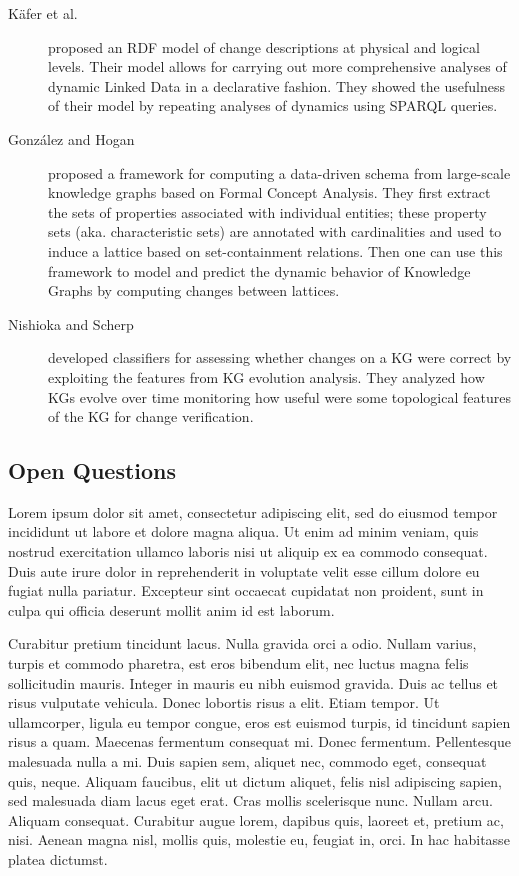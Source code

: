 \documentclass[sw]{iosart2x}
\begin{document}
\begin{description}
	\item[K{\"{a}}fer et al. \cite{KaferWA17}] proposed an RDF model of change descriptions at physical and logical levels. Their model allows for carrying out more comprehensive analyses of dynamic Linked Data in a declarative fashion. They showed the usefulness of their model by repeating analyses of dynamics using SPARQL queries.
	
	
	\item[Gonz\'{a}lez and Hogan \cite{GonzalezH18}]proposed a framework for computing a data-driven schema from large-scale knowledge graphs based on Formal Concept Analysis. They first extract the sets of properties associated with individual entities; these property sets (aka. characteristic sets) are annotated with cardinalities and used to induce a lattice based on set-containment relations. Then one can use this framework to model and predict the dynamic behavior of Knowledge Graphs by computing changes between lattices.
	
	\item[Nishioka and Scherp \cite{NishiokaS18}] developed classifiers for assessing whether changes on a KG were correct by exploiting the features from KG evolution analysis. They analyzed how KGs evolve over time monitoring how useful were some topological features of the KG for change verification.
	
	
\end{description}

\subsection{Open Questions}\label{Open1}

Lorem ipsum dolor sit amet, consectetur adipiscing elit, sed do eiusmod tempor incididunt ut labore et dolore magna aliqua. Ut enim ad minim veniam, quis nostrud exercitation ullamco laboris nisi ut aliquip ex ea commodo consequat. Duis aute irure dolor in reprehenderit in voluptate velit esse cillum dolore eu fugiat nulla pariatur. Excepteur sint occaecat cupidatat non proident, sunt in culpa qui officia deserunt mollit anim id est laborum.

Curabitur pretium tincidunt lacus. Nulla gravida orci a odio. Nullam varius, turpis et commodo pharetra, est eros bibendum elit, nec luctus magna felis sollicitudin mauris. Integer in mauris eu nibh euismod gravida. Duis ac tellus et risus vulputate vehicula. Donec lobortis risus a elit. Etiam tempor. Ut ullamcorper, ligula eu tempor congue, eros est euismod turpis, id tincidunt sapien risus a quam. Maecenas fermentum consequat mi. Donec fermentum. Pellentesque malesuada nulla a mi. Duis sapien sem, aliquet nec, commodo eget, consequat quis, neque. Aliquam faucibus, elit ut dictum aliquet, felis nisl adipiscing sapien, sed malesuada diam lacus eget erat. Cras mollis scelerisque nunc. Nullam arcu. Aliquam consequat. Curabitur augue lorem, dapibus quis, laoreet et, pretium ac, nisi. Aenean magna nisl, mollis quis, molestie eu, feugiat in, orci. In hac habitasse platea dictumst.
\end{document}
